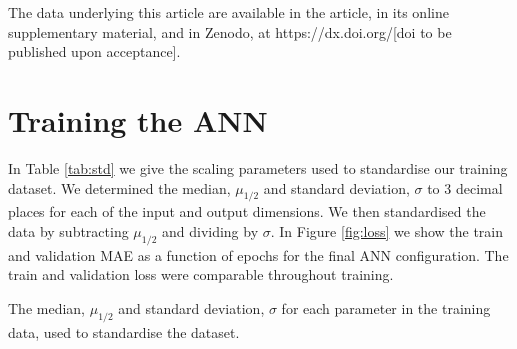\documentclass[fleqn,usenatbib]{mnras}
\begin{document}

The data underlying this article are available in the article, in its online supplementary material, and in Zenodo, at https://dx.doi.org/[doi to be published upon acceptance].








\appendix

\section{Training the ANN}\label{sec:apx-train}



In Table \ref{tab:std} we give the scaling parameters used to standardise our training dataset. We determined the median, $\mu_{1/2}$ and standard deviation, $\sigma$ to 3 decimal places for each of the input and output dimensions. We then standardised the data by subtracting $\mu_{1/2}$ and dividing by $\sigma$. In Figure \ref{fig:loss} we show the train and validation MAE as a function of epochs for the final ANN configuration. The train and validation loss were comparable throughout training.

\begin{table}
    \caption{The median, $\mu_{1/2}$ and standard deviation, $\sigma$ for each parameter in the training data, used to standardise the dataset.}
    \label{tab:std}
    
\end{table}
\end{document}
